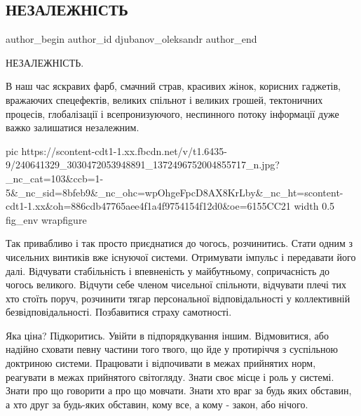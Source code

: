  
 
 
 
 
 
\subsection{НЕЗАЛЕЖНІСТЬ}
\label{sec:24_08_2021.fb.djubanov_oleksandr.1.nezalezhnist}
 
\ifcmt
 author_begin
   author_id djubanov_oleksandr
 author_end
\fi

НЕЗАЛЕЖНІСТЬ.

В наш час яскравих фарб, смачний страв, красивих жінок, корисних гаджетів,
вражаючих спецефектів, великих спільнот і великих грошей, тектоничних процесів,
глобалізації і всепронизуючого, неспинного потоку інформації дуже важко
залишатися незалежним.

\ifcmt
  pic https://scontent-cdt1-1.xx.fbcdn.net/v/t1.6435-9/240641329_3030472053948891_1372496752004855717_n.jpg?_nc_cat=103&ccb=1-5&_nc_sid=8bfeb9&_nc_ohc=wpOhgeFpcD8AX8KrLby&_nc_ht=scontent-cdt1-1.xx&oh=886cdb47765aee4f1a4f9754154f12d0&oe=6155CC21
  width 0.5
	fig_env wrapfigure
\fi

Так привабливо і так просто приєднатися до чогось, розчинитись. Стати одним з
чисельних винтиків вже існуючої системи. Отримувати імпульс і передавати його
далі. Відчувати стабільність і впевненість у майбутньому, сопричасність до
чогось великого. Відчути себе членом чисельної спільноти, відчувати плечі тих
хто стоїть поруч, розчинити тягар персональної відповідальності у коллективній
безвідповідальності. Позбавитися страху самотності.

Яка ціна? Підкоритись. Увійти в підпорядкування іншим. Відмовитися, або надійно
сховати певну частини того твого, що йде у протиріччя з суспільною доктриною
системи. Працювати і відпочивати в межах прийнятих норм, реагувати в межах
прийнятого світогляду. Знати своє місце і роль у системі. Знати про що говорити
а про що мовчати. Знати хто враг за будь яких обставин, а хто друг за будь-яких
обставин, кому все, а кому - закон, або нічого.

